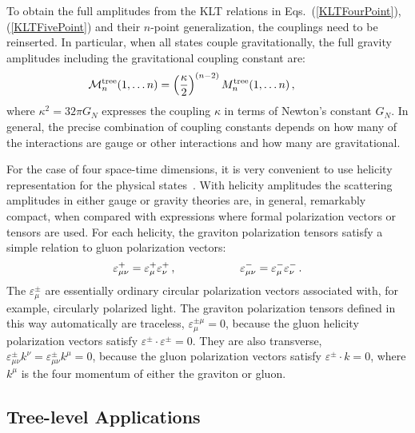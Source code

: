 To obtain the full amplitudes from the KLT relations in
Eqs.~(\ref{KLTFourPoint}), (\ref{KLTFivePoint}) and their $n$-point
generalization, the couplings need to be reinserted.  In particular,
when all states couple gravitationally, the full gravity amplitudes
including the gravitational coupling constant are:
%
\begin{equation}
{\cal M}_n^{\rm tree} (1,\ldots n) = 
\left({  \kappa \over 2} \right)^{(n-2)} 
M_n^{\rm tree}(1,\ldots n)\,, \hskip 1 cm 
\label{GravityCouplingAmplitude}
\end{equation}
where $\kappa^2 = 32\pi G_N$ expresses the coupling $\kappa$ in terms
of Newton's constant $G_N$.  In general, the precise combination of
coupling constants depends on how many of the interactions are gauge 
or other interactions and how many are gravitational.

For the case of four space-time dimensions, it is very convenient to
use helicity representation for the physical
states~\cite{Causmaecker81,Kleiss85,Xu87}.  With helicity amplitudes
the scattering amplitudes in either gauge or gravity theories are, in
general, remarkably compact, when compared with expressions where formal
polarization vectors or tensors are used.  For each helicity, the
graviton polarization tensors satisfy a simple relation to gluon
polarization vectors:
%
\begin{equation}
\varepsilon_{\mu\nu}^+ = \varepsilon_{\mu}^+ \varepsilon_{\nu}^+\,,
\hskip 2 cm 
\varepsilon_{\mu\nu}^- = \varepsilon_{\mu}^- \varepsilon_{\nu}^- \,.
\end{equation}
%
The $\varepsilon_{\mu}^\pm$ are essentially ordinary circular
polarization vectors associated with, for example, circularly
polarized light.  The graviton polarization tensors defined in this
way automatically are traceless, $\varepsilon_{\mu}^{\pm\mu} = 0$,
because the gluon helicity polarization vectors satisfy
$\varepsilon^\pm \cdot \varepsilon^\pm = 0$.  They are also
transverse, $\varepsilon_{\mu\nu}^\pm k^\nu = \varepsilon_{\mu\nu}^\pm
k^\mu = 0$, because the gluon polarization vectors satisfy
$\varepsilon^\pm \cdot k = 0$, where $k^\mu$ is the four momentum of
either the graviton or gluon.


\subsection{Tree-level Applications}

